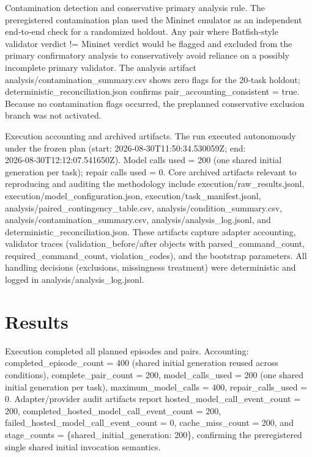 \documentclass[conference]{IEEEtran}
\begin{document}
Contamination detection and conservative primary analysis rule. The preregistered contamination plan used the Mininet emulator as an independent end‑to‑end check for a randomized holdout. Any pair where Batfish‑style validator verdict != Mininet verdict would be flagged and excluded from the primary confirmatory analysis to conservatively avoid reliance on a possibly incomplete primary validator. The analysis artifact analysis/contamination\_summary.csv shows zero flags for the 20‑task holdout; deterministic\_reconciliation.json confirms pair\_accounting\_consistent = true. Because no contamination flags occurred, the preplanned conservative exclusion branch was not activated.

Execution accounting and archived artifacts. The run executed autonomously under the frozen plan (start: 2026‑08‑30T11:50:34.530059Z; end: 2026‑08‑30T12:12:07.541650Z). Model calls used = 200 (one shared initial generation per task); repair calls used = 0. Core archived artifacts relevant to reproducing and auditing the methodology include execution/raw\_results.jsonl, execution/model\_configuration.json, execution/task\_manifest.jsonl, analysis/paired\_contingency\_table.csv, analysis/condition\_summary.csv, analysis/contamination\_summary.csv, analysis/analysis\_log.jsonl, and deterministic\_reconciliation.json. These artifacts capture adapter accounting, validator traces (validation\_before/after objects with parsed\_command\_count, required\_command\_count, violation\_codes), and the bootstrap parameters. All handling decisions (exclusions, missingness treatment) were deterministic and logged in analysis/analysis\_log.jsonl.

\section{Results}
Execution completed all planned episodes and pairs. Accounting: completed\_episode\_count = 400 (shared initial generation reused across conditions), complete\_pair\_count = 200, model\_calls\_used = 200 (one shared initial generation per task), maximum\_model\_calls = 400, repair\_calls\_used = 0. Adapter/provider audit artifacts report hosted\_model\_call\_event\_count = 200, completed\_hosted\_model\_call\_event\_count = 200, failed\_hosted\_model\_call\_event\_count = 0, cache\_miss\_count = 200, and stage\_counts = \{shared\_initial\_generation: 200\}, confirming the preregistered single shared initial invocation semantics.
\end{document}
